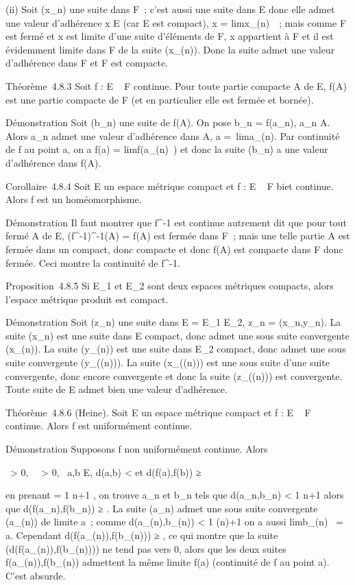 \documentclass[]{article}
\begin{document}
(ii) Soit (x\_n) une suite dans F~; c'est aussi une suite dans E
donc elle admet une valeur d'adhérence x \in E (car E est compact), x
= limx\_\phi(n)~~; mais comme F est fermé
et x est limite d'une suite d'éléments de F, x appartient à F et il est
évidemment limite dans F de la suite (x\_\phi(n)). Donc la suite
admet une valeur d'adhérence dans F et F est compacte.

Théorème~4.8.3 Soit f : E \rightarrow~ F continue. Pour toute partie compacte A de
E, f(A) est une partie compacte de F (et en particulier elle est fermée
et bornée).

Démonstration Soit (b\_n) une suite de f(A). On pose
b\_n = f(a\_n), a\_n \in A. Alors a\_n
admet une valeur d'adhérence dans A, a =\
lima\_\phi(n). Par continuité de f au point a, on a f(a)
= limf(a\_\phi(n)~) et donc la suite
(b\_n) a une valeur d'adhérence dans f(A).

Corollaire~4.8.4 Soit E un espace métrique compact et f : E \rightarrow~ F
bi\jmathective et continue. Alors f est un homéomorphisme.

Démonstration Il faut montrer que f^-1 est continue autrement
dit que pour tout fermé A de E, (f^-1)^-1(A) =
f(A) est fermée dans F~; mais une telle partie A est fermée dans un
compact, donc compacte et donc f(A) est compacte dans F donc fermée.
Ceci montre la continuité de f^-1.

Proposition~4.8.5 Si E\_1 et E\_2 sont deux espaces
métriques compacts, alors l'espace métrique produit est compact.

Démonstration Soit (z\_n) une suite dans E = E\_1 \times
E\_2, z\_n = (x\_n,y\_n). La suite
(x\_n) est une suite dans E compact, donc admet une sous suite
convergente (x\_\phi(n)). La suite (y\_\phi(n)) est une suite
dans E\_2 compact, donc admet une sous suite convergente
(y\_\phi(\psi(n))). La suite (x\_\phi(\psi(n))) est une sous suite
d'une suite convergente, donc encore convergente et donc la suite
(z\_\phi(\psi(n))) est convergente. Toute suite de E admet bien une
valeur d'adhérence.

Théorème~4.8.6 (Heine). Soit E un espace métrique compact et f : E \rightarrow~ F
continue. Alors f est uniformément continue.

Démonstration Supposons f non uniformément continue. Alors

\exists~\epsilon \textgreater{} 0,
\forall~~\eta \textgreater{} 0,\quad
\exists~a,b \in E, d(a,b) \textless{}
\eta\text et d(f(a),f(b)) ≥ \epsilon

en prenant \eta = 1 \over n+1 , on trouve a\_n
et b\_n tels que d(a\_n,b\_n) \textless{} 1
\over n+1 alors que d(f(a\_n),f(b\_n))
≥ \epsilon. La suite (a\_n) admet une sous suite convergente
(a\_\phi(n)) de limite a~; comme d(a\_\phi(n),b\_\phi(n))
\textless{} 1 \over \phi(n)+1 on a aussi
limb\_\phi(n)~ = a. Cependant
d(f(a\_\phi(n)),f(b\_\phi(n))) ≥ \epsilon, ce qui montre que la suite
(d(f(a\_\phi(n)),f(b\_\phi(n)))) ne tend pas vers 0, alors que
les deux suites f(a\_\phi(n)),f(b\_\phi(n)) admettent la même
limite f(a) (continuité de f au point a). C'est absurde.
\end{document}
